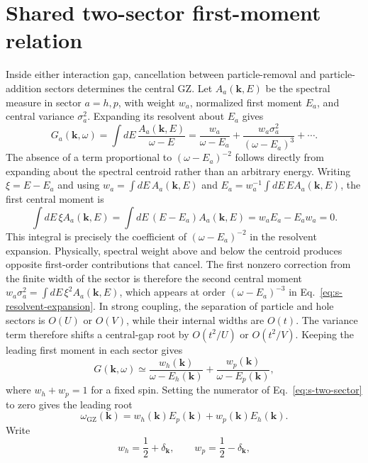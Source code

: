 \documentclass[10pt]{article}
\newcommand{\wzero}{\omega_{\mathrm{GZ}}}
\newcommand{\dk}{\delta_{\mathbf{k}}}
\begin{document}
\section{Shared two-sector first-moment relation}
Inside either interaction gap, cancellation between particle-removal and particle-addition sectors determines the central GZ. Let $A_a(\mathbf k,E)$ be the spectral measure in sector $a=h,p$, with weight $w_a$, normalized first moment $E_a$, and central variance $\sigma_a^2$. Expanding its resolvent about $E_a$ gives
\begin{equation}
G_a(\mathbf k,\omega)=\int dE\,\frac{A_a(\mathbf k,E)}{\omega-E}
=\frac{w_a}{\omega-E_a}+\frac{w_a\sigma_a^2}{(\omega-E_a)^3}+\cdots .
\label{eq:s-resolvent-expansion}
\end{equation}
The absence of a term proportional to $(\omega-E_a)^{-2}$ follows directly from expanding about the spectral centroid rather than an arbitrary energy. Writing $\xi=E-E_a$ and using $w_a=\int dE\,A_a(\mathbf k,E)$ and $E_a=w_a^{-1}\int dE\,E A_a(\mathbf k,E)$, the first central moment is
\[
\int dE\,\xi A_a(\mathbf k,E)
=\int dE\,(E-E_a)A_a(\mathbf k,E)
=w_aE_a-E_aw_a=0.
\]
This integral is precisely the coefficient of $(\omega-E_a)^{-2}$ in the resolvent expansion. Physically, spectral weight above and below the centroid produces opposite first-order contributions that cancel. The first nonzero correction from the finite width of the sector is therefore the second central moment $w_a\sigma_a^2=\int dE\,\xi^2A_a(\mathbf k,E)$, which appears at order $(\omega-E_a)^{-3}$ in Eq.~\ref{eq:s-resolvent-expansion}. In strong coupling, the separation of particle and hole sectors is $O(U)$ or $O(V)$, while their internal widths are $O(t)$. The variance term therefore shifts a central-gap root by $O(t^2/U)$ or $O(t^2/V)$. Keeping the leading first moment in each sector gives
\begin{equation}
G(\mathbf{k},\omega)\simeq
\frac{w_h(\mathbf{k})}{\omega-E_h(\mathbf{k})}
+\frac{w_p(\mathbf{k})}{\omega-E_p(\mathbf{k})},
\label{eq:s-two-sector}
\end{equation}
where $w_h+w_p=1$ for a fixed spin. Setting the numerator of Eq.~\ref{eq:s-two-sector} to zero gives the leading root
\begin{equation}
\wzero(\mathbf{k})=w_h(\mathbf{k})E_p(\mathbf{k})+w_p(\mathbf{k})E_h(\mathbf{k}).
\label{eq:s-two-sector-root}
\end{equation}
Write
\begin{equation}
w_h=\frac12+\dk,\qquad w_p=\frac12-\dk,
\label{eq:s-sector-weights}
\end{equation}
\end{document}
